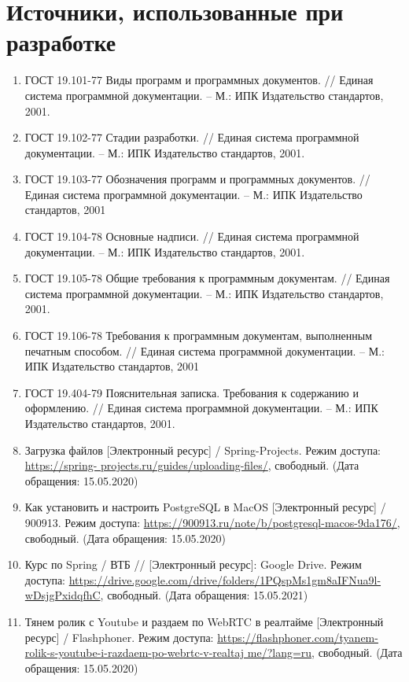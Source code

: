 \section{Источники, использованные при разработке}

\begin{enumerate}
    \item ГОСТ 19.101-77 Виды программ и программных документов. // Единая система программной документации. – М.: ИПК Издательство стандартов, 2001.
    \item ГОСТ 19.102-77 Стадии разработки. // Единая система программной документации. – М.: ИПК Издательство стандартов, 2001.
    \item ГОСТ 19.103-77 Обозначения программ и программных документов. // Единая система программной документации. – М.: ИПК Издательство стандартов, 2001
    \item ГОСТ 19.104-78 Основные надписи. // Единая система программной документации. – М.: ИПК Издательство стандартов, 2001.
    \item ГОСТ 19.105-78 Общие требования к программным документам. // Единая система программной документации. – М.: ИПК Издательство стандартов, 2001.
    \item ГОСТ 19.106-78 Требования к программным документам, выполненным печатным способом. // Единая система программной документации. – М.: ИПК Издательство стандартов, 2001
    \item ГОСТ 19.404-79 Пояснительная записка. Требования к содержанию и оформлению. // Единая система программной документации. – М.: ИПК Издательство стандартов, 2001.
    \item Загрузка файлов [Электронный ресурс] / Spring-Projects. Режим доступа: \href{https://spring-projects.ru/guides/uploading-files/}{https://spring- projects.ru/guides/uploading-files/}, свободный. (Дата обращения: 15.05.2020)
    \item Как установить и настроить PostgreSQL в MacOS [Электронный ресурс] / 900913. Режим доступа: \url{https://900913.ru/note/b/postgresql-macos-9da176/}, свободный. (Дата обращения: 15.05.2020)
    \item Курс по Spring / ВТБ // [Электронный ресурс]: Google Drive. Режим доступа: \url{https://drive.google.com/drive/folders/1PQspMs1gm8aIFNua9l-wDsjgPxidqfhC}, свободный. (Дата обращения: 15.05.2021)
    \item Тянем ролик с Youtube и раздаем по WebRTC в реалтайме [Электронный ресурс] / Flashphoner. Режим доступа: \href{https://flashphoner.com/tyanem-rolik-s-youtube-i-razdaem-po-webrtc-v-realtajme/?lang=ru}{https://flashphoner.com/tyanem-rolik-s-youtube-i-razdaem-po-webrtc-v-realtaj me/?lang=ru}, свободный. (Дата обращения: 15.05.2020)

\end{enumerate}
